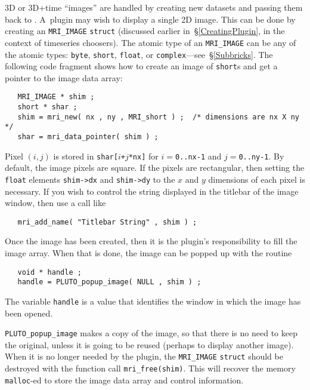 3D or 3D+time ``images'' are handled by creating new datasets and
passing them back to \afni.  A~plugin may wish to display a single
2D image.  This can be done by creating an {\tt MRI\_IMAGE} {\tt struct}
(discussed earlier in~\S\ref{CreatingPlugin}, in the context of timeseries choosers).
The atomic type of an {\tt MRI\_IMAGE} can be any of the \afnit
atomic types: {\tt byte}, {\tt short}, {\tt float}, or {\tt complex}---see~\S\ref{Subbricks}.
The following code fragment shows how to create an image of {\tt short}s
and get a pointer to the image data array:
\begin{samepage}\begin{verbatim}
   MRI_IMAGE * shim ;
   short * shar ;
   shim = mri_new( nx , ny , MRI_short ) ;  /* dimensions are nx X ny */
   shar = mri_data_pointer( shim ) ;
\end{verbatim}\end{samepage}
Pixel $(i,j)$ is stored in {\tt shar[$i$+$j$*nx]} for $i={}${\tt 0..nx-1}
and $j={}${\tt 0..ny-1}.  By default, the image pixels are square.
If the pixels are rectangular, then setting the {\tt float} elements
{\tt shim->dx} and {\tt shim->dy}
to the $x$ and $y$ dimensions of each pixel is necessary.
If you wish to control the string displayed in the titlebar of
the image window, then use a call like
\begin{samepage}\begin{verbatim}
   mri_add_name( "Titlebar String" , shim ) ;
\end{verbatim}\end{samepage}
Once the image has been created, then it is the plugin's responsibility
to fill the image array.  When that is done, the image can be popped up
with the routine
\begin{samepage}\begin{verbatim}
   void * handle ;
   handle = PLUTO_popup_image( NULL , shim ) ;
\end{verbatim}\end{samepage}
The variable {\tt handle} is a value that identifies the window in which
the image has been opened.

{\tt PLUTO\_popup\_image} makes a copy of the image, so that there is
no need to keep the original, unless it is going to be reused (perhaps
to display another image).  When it is no longer needed by the plugin,
the {\tt MRI\_IMAGE} {\tt struct} should be destroyed with the
function call {\tt mri\_free(shim)}.  This will recover the
memory {\tt malloc}-ed to store the image data array and control information.


